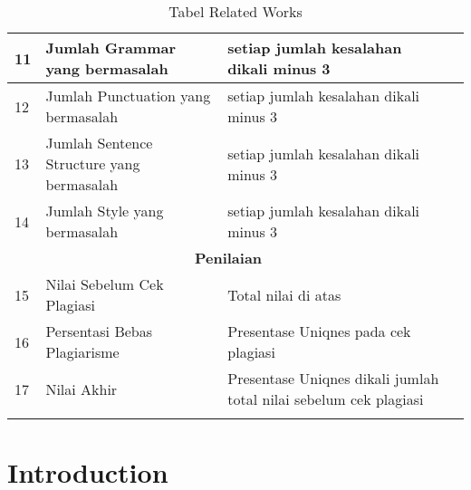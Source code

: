 \begin{longtable}{|p{}|p{}|p{}|p{}|}
11 &Jumlah Grammar yang bermasalah&setiap jumlah kesalahan dikali minus 3& \\ \hline

12 &Jumlah Punctuation yang bermasalah&setiap jumlah kesalahan dikali minus 3& \\ \hline

13 &Jumlah Sentence Structure yang bermasalah&setiap jumlah kesalahan dikali minus 3& \\ \hline

14 &Jumlah Style yang bermasalah&setiap jumlah kesalahan dikali minus 3& \\ \hline

\multicolumn{3}{c}{\textbf{Penilaian}}\\ \hline

15 &Nilai Sebelum Cek Plagiasi&Total nilai di atas& \\ \hline

16 &Persentasi Bebas Plagiarisme&Presentase Uniqnes pada cek plagiasi& \\ \hline

17 &Nilai Akhir&Presentase Uniqnes dikali jumlah total nilai sebelum cek plagiasi& \\ \hline

\caption{Tabel Related Works}
\label{table:contoh}
\end{longtable}



\section{Introduction}

